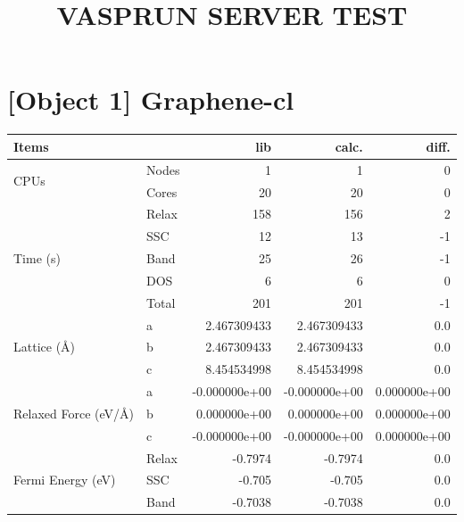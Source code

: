 \documentclass[a4paper, 12pt]{article}
\title{\textbf{VASPRUN SERVER TEST}}
\author{}
\begin{document}
\maketitle
\tableofcontents
\clearpage

\section{[Object 1] Graphene-cl}
\begin{table}[H]\centering
  \begin{tabular}{l|l||rrr}
    \hline
    \hline
    \multicolumn{2}{l||}{Items} & lib & calc. & diff.\\
    \hline
    \multirow{2}{*}{CPUs} & Nodes &          1 &          1 &          0\\
                           & Cores &         20 &         20 &          0\\
    \hline
    \multirow{5}{*}{Time (s)} & Relax &        158 &        156 &         2\\
                               & SSC   &         12 &         13 &        -1\\
                               & Band  &         25 &         26 &        -1\\
                               & DOS   &          6 &          6 &         0\\
                               & Total &        201 &        201 &        -1\\
    \hline
    \multirow{3}{*}{Lattice (\AA)} & a & 2.467309433 & 2.467309433 &       0.0\\
                                     & b & 2.467309433 & 2.467309433 &       0.0\\
                                     & c & 8.454534998 & 8.454534998 &       0.0\\
    \hline
    \multirow{3}{*}{Relaxed Force (eV/\AA)} & a & -0.000000e+00 & -0.000000e+00 &0.000000e+00\\
                                              & b & 0.000000e+00 & 0.000000e+00 &0.000000e+00\\
                                              & c & -0.000000e+00 & -0.000000e+00 &0.000000e+00\\
    \hline
    \multirow{4}{*}{Fermi Energy (eV)} & Relax &    -0.7974 &    -0.7974 &       0.0\\
                                        & SSC   &     -0.705 &     -0.705 &       0.0\\
                                        & Band  &    -0.7038 &    -0.7038 &       0.0\\

\end{tabular}
\end{table}
\end{document}
